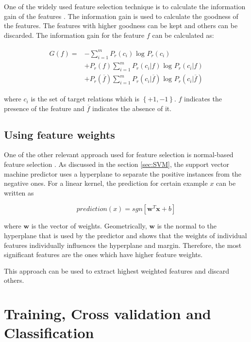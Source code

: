 One of the widely used feature selection technique is to calculate the information gain of the features \cite{yang1997comparative}. The information gain is used to calculate the goodness of the features. The features with higher goodness can be kept and others can be discarded. The information gain for the feature $f$ can be calculated as:

\begin{align}
\begin{aligned}
 G \left( f \right) = & -  \sum^m_{i=1} P_r(c_i) \text{ log } P_r(c_i) \\
  & + P_r(f) \sum^m_{i=1} P_r(c_i|f) \text{ log } P_r(c_i|f)\\
  & +  P_r(\overline{f}) \sum^m_{i=1} P_r(c_i|\overline{f}) \text{ log } P_r(c_i|\overline{f})
\end{aligned}
\end{align}

where $c_i$ is the set of target relations which is $\left\lbrace +1, -1 \right\rbrace$. $f$ indicates the presence of the feature and $\overline{f}$ indicates the absence of it.

\subsection{Using feature weights}\label{subsec:FWR}

One of the other relevant approach used for feature selection is normal-based feature selection \cite{brank2002feature}. As discussed in the section \ref{sec:SVM}, the support vector machine predictor uses a hyperplane to separate the positive instances from the negative ones. For a linear kernel, the prediction for certain example $x$ can be written as

$$
prediction(x) = sgn \left[ \mathbf{w}^T\mathbf{x} + b \right]
$$

where $\mathbf{w}$ is the vector of weights. Geometrically, $\mathbf{w}$ is the normal to the hyperplane that is used by the predictor and \cite{brank2002feature} shows that the weights of individual features individually influences the hyperplane and margin. Therefore, the most significant features are the ones which have higher feature weights.

This approach can be used to extract highest weighted features and discard others.


\section{Training, Cross validation and Classification}\label{sec:training}

